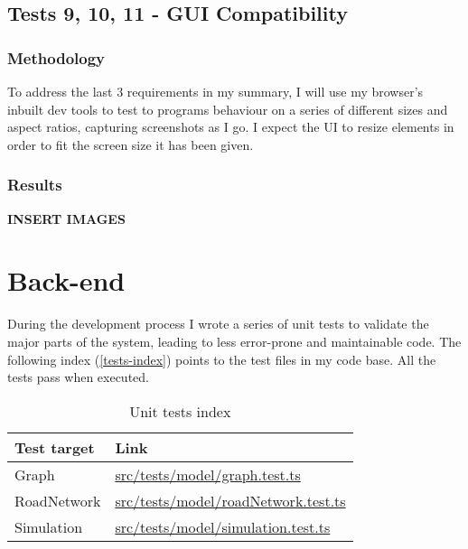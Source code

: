     \subsection{Tests 9, 10, 11 - GUI Compatibility}
    \label{testing:t9,10,11}

        \subsubsection{Methodology}

            To address the last 3 requirements in my summary, I will use my browser's inbuilt dev tools to test to programs behaviour on a series of different sizes and aspect ratios, capturing screenshots as I go. I expect the UI to resize elements in order to fit the screen size it has been given.

        \subsubsection{Results}

            \textbf{INSERT IMAGES}

\section{Back-end}

    During the development process I wrote a series of unit tests to validate the major parts of the system, leading to less error-prone and maintainable code. The following index (\autoref{tests-index}) points to the test files in my code base. All the tests pass when executed.

    \begin{table}[ht]
        \begin{tabular}{|p{}|p{}|}
            \hline
            \textbf{Test target} & \textbf{Link}\\\hline
            Graph & \href{https://github.com/joshua-smart/traffic-simulator/blob/main/src/tests/model/graph.test.ts}{src/tests/model/graph.test.ts}\\\hline
            RoadNetwork & \href{https://github.com/joshua-smart/traffic-simulator/blob/main/src/tests/model/roadNetwork.test.ts}{src/tests/model/roadNetwork.test.ts}\\\hline
            Simulation & \href{https://github.com/joshua-smart/traffic-simulator/blob/main/src/tests/model/simulation.test.ts}{src/tests/model/simulation.test.ts}\\\hline
        \end{tabular}
        \caption{Unit tests index}
        \label{tests-index}
    \end{table}
